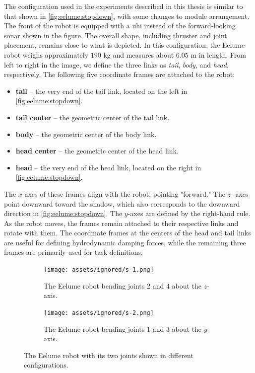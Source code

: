 The configuration used in the experiments described in this thesis is similar 
to that shown in \autoref{fig:eelume:stopdown}, with some changes to module 
arrangement. The front of the robot is equipped with a \gls{uhi} instead of 
the forward-looking sonar shown in the figure. The overall shape, including 
thruster and joint placement, remains close to what is depicted. In this 
configuration, the Eelume robot weighs approximately $190$ kg and measures 
about $6.05$ m in length. From left to right in the image, we define the three 
links as \textit{tail}, \textit{body}, and \textit{head}, respectively. The 
following five coordinate frames are attached to the robot:
\begin{itemize}
\item \textbf{tail} – the very end of the tail link, located on the left in \autoref{fig:eelume:stopdown}.
\item \textbf{tail center} – the geometric center of the tail link.
\item \textbf{body} – the geometric center of the body link.
\item \textbf{head center} – the geometric center of the head link.
\item \textbf{head} – the very end of the head link, located on the right in \autoref{fig:eelume:stopdown}.
\end{itemize}
The $x$-axes of these frames align with the robot, pointing "forward." The $z$-
axes point downward toward the shadow, which also corresponds to the downward 
direction in \autoref{fig:eelume:stopdown}. The $y$-axes are defined by the 
right-hand rule. As the robot moves, the frames remain attached to their 
respective links and rotate with them. The coordinate frames at the centers of 
the head and tail links are useful for defining hydrodynamic damping forces, 
while the remaining three frames are primarily used for task definitions.
\begin{figure}[h!]
    \centering
    \begin{subfigure}{0.45\textwidth}
        \centering
        \texttt{[image: assets/ignored/s-1.png]}
        \caption{The Eelume robot bending joints \(2\) and \(4\) about the $z$-axis.}
        \label{fig:eelume:joints:1}
    \end{subfigure}
    \hfill
    \begin{subfigure}{0.45\textwidth}
        \centering
        \texttt{[image: assets/ignored/s-2.png]}
        \caption{The Eelume robot bending joints \(1\) and \(3\) about the $y$-axis.}
        \label{fig:eelume:joints:2}
    \end{subfigure}
    \caption{The Eelume robot with its two joints shown in different configurations.}
\label{fig:eelume:joints}
\end{figure}

